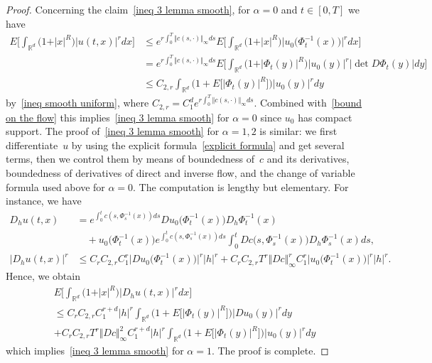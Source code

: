 \documentclass[a4paper,10pt]{article}
\newcommand\1{\mathbbm{1}}
\numberwithin{equation}{section}
\begin{document}
\begin{proof}
Concerning the claim~\eqref{ineq 3 lemma smooth}, for $\alpha=0$ and $t \in [0,T]$ we have
\begin{align*}
E\Big[  \int_{\mathbb{R}^{d}} \big(1+ \vert x \vert^{R} \big)  \vert u (t,x) \vert^{r} dx \Big] & \leq e^{r\int_{0}^{T} \Vert c(s,\cdot) \Vert_{\infty}ds} E\Big[
\int_{\mathbb{R}^{d}} \big(1+ \vert x \vert^{R} \big) \big\vert u_{0} \big( \Phi_{t}^{-1}(x) \big) \big\vert^{r} dx \Big]  \\
&  =e^{r\int_{0}^{T} \Vert c(s,\cdot) \Vert_{\infty}ds} E \Big[ \int_{\mathbb{R}^{d}} \big(1+ \vert \Phi_{t} (y) \vert^{R} \big)  \vert u_{0}(y) \vert^{r} \vert \det D\Phi_{t}(y) \vert dy \Big]  \\
&  \leq C_{2,r}\int_{\mathbb{R}^{d}} \big(1+ E\big[ \vert \Phi_{t}(y) \vert^{R}\big]  \big) \vert u_{0}(y) \vert^{r}dy
\end{align*}
by~\eqref{ineq smooth uniform}, where $C_{2,r}=C_{1}^d e^{r\int_{0}^{T} \Vert c(s,\cdot)  \Vert_{\infty} ds}$. Combined with~\eqref{bound on the flow} 
this implies~\eqref{ineq 3 lemma smooth} for $\alpha=0$ since $u_{0}$ has compact support. The proof of~\eqref{ineq 3 lemma smooth} for $\alpha=1,2$ is similar: 
we first differentiate~$u$ by using the explicit formula~\eqref{explicit formula} and get several terms, then we control them by means of boundedness of~$c$ and its derivatives, boundedness of derivatives of direct and inverse flow, and the change of variable formula used above for $\alpha=0$. The computation is lengthy but elementary. For instance, we have
\begin{align*}
D_{h}u (t,x)   &  =e^{\int_{0}^{t}c(s,\Phi_{s}^{-1}(x) ) ds} Du_{0}\big(\Phi_{t}^{-1}(x)  \big)D_{h}\Phi_{t}^{-1}(x)  \\
&  \quad{} + u_{0}\big(\Phi_{t}^{-1}(x) \big)  e^{\int_{0}^{t}c(s,\Phi_{s}^{-1}(x))ds} \int_{0}^{t} Dc\big(s,\Phi_{s}^{-1}(x) \big)  D_{h}\Phi_{s}^{-1}(x)  ds , \\
\vert D_{h} u(t,x)\vert^{r} & \leq C_{r}C_{2,r} C_{1}^{r} \big\vert Du_{0}\big(\Phi_{t}^{-1}(x)  \big) \big\vert^{r} \vert h\vert^{r} + C_{r}C_{2,r} T^{r} \Vert Dc \Vert_{\infty}^{r} C_{1}^{r} \big\vert u_{0}\big(\Phi_{t}^{-1}(x) \big) \big\vert^{r} \vert h\vert^{r}.
\end{align*}
Hence, we obtain
\begin{multline*}
E\Big[ \int_{\mathbb{R}^{d}} \big(1+\vert x\vert^{R} \big) \vert D_{h}u(t,x)\vert^{r} dx\Big] \\
\leq C_{r} C_{2,r}C_{1}^{r+d} \vert h\vert^{r} \int_{\mathbb{R}^{d}} \big(1+E\big[ \vert \Phi_{t}(y)\vert^{R} \big] \big) \vert Du_{0}(y) \vert^{r} dy\\
+C_{r}C_{2,r}T^{r} \Vert Dc\Vert_{\infty}^{2} C_{1}^{r+d} \vert h\vert^{r} \int_{\mathbb{R}^{d}} \big(1+E\big[ \vert \Phi_{t}(y) \vert^{R}\big] \big) \vert
u_{0}(y) \vert^{r}dy
\end{multline*}
which implies~\eqref{ineq 3 lemma smooth} for $\alpha=1$. The proof is complete.
\end{proof}
\end{document}

